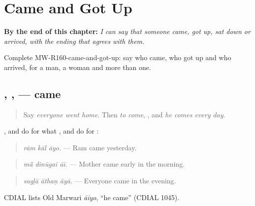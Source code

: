 
\chapter{Came and Got Up}
\label{ch:mw-a2-came-and-got-up}

\begin{chapteropening}
\textbf{By the end of this chapter:} \emph{I can say that someone came, got up, sat down or arrived, with the ending that agrees with them.}

Complete MW-R160-came-and-got-up: say who came, who got up and who arrived, for a man, a woman and more than one.
\end{chapteropening}

\section[\texorpdfstring{\mw{आयो} · \mw{आई} · \mw{आया} (āyo · āī · āyā)}{आयो · आई · आया (āyo · āī · āyā)}]{, ,  — came}

\label{lesson:MW-C160-ayo}



\begin{quote}
Say \emph{everyone went home}. Then \emph{to come}, \textbf{}, and \emph{he comes every day}.
\end{quote}

\begin{grammarlens}[title={Grammar Lens: the past of \mw{आवणो}}]
\textbf{}, \textbf{} and \textbf{} do for \textbf{} what \textbf{}, \textbf{} and \textbf{} do for \textbf{}:

\begin{quote}
\textbf{  }
\end{quote}

\begin{quote}
\emph{rām kāl āyo.} — Ram came yesterday.
\end{quote}

\begin{quote}
\textbf{  }
\end{quote}

\begin{quote}
\emph{mā̃ dinūgai āī.} — Mother came early in the morning.
\end{quote}

\begin{quote}
\textbf{  }
\end{quote}

\begin{quote}
\emph{sagḷā āthaṇ āyā.} — Everyone came in the evening.
\end{quote}

CDIAL lists Old Marwari \emph{āīyo}, \textquotedblleft{}he came\textquotedblright{} (CDIAL 1045).
\end{grammarlens}

